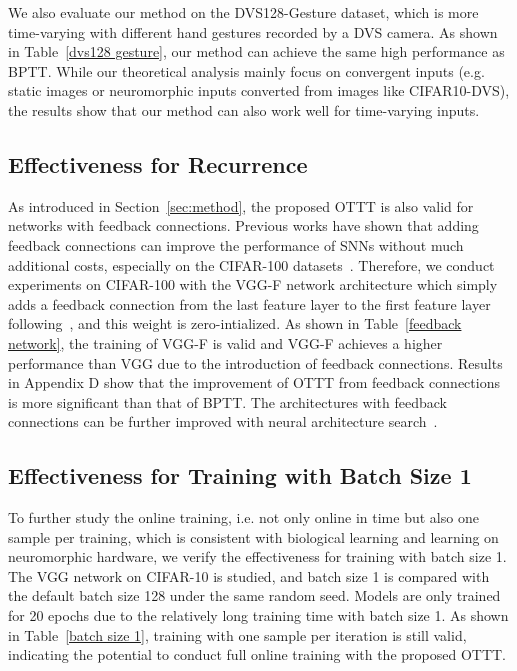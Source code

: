 \documentclass{article}
\begin{document}
We also evaluate our method on the DVS128-Gesture dataset, which is more time-varying with different hand gestures recorded by a DVS camera. As shown in Table~\ref{dvs128 gesture}, our method can achieve the same high performance as BPTT. While our theoretical analysis mainly focus on convergent inputs (e.g. static images or neuromorphic inputs converted from images like CIFAR10-DVS), the results show that our method can also work well for time-varying inputs.

\vspace{-2mm}
\subsection{Effectiveness for Recurrence}
\vspace{-2.5mm}
As introduced in Section~\ref{sec:method}, the proposed OTTT is also valid for networks with feedback connections. Previous works have shown that adding feedback connections can improve the performance of SNNs without much additional costs, especially on the CIFAR-100 datasets~\cite{xiao2021training,kim2022neural}. Therefore, we conduct experiments on CIFAR-100 with the VGG-F network architecture which simply adds a feedback connection from the last feature layer to the first feature layer following~\cite{xiao2021training}, and this weight is zero-intialized. As shown in Table~\ref{feedback network}, the training of VGG-F is valid and VGG-F achieves a higher performance than VGG due to the introduction of feedback connections. Results in Appendix D show that the improvement of OTTT from feedback connections is more significant than that of BPTT. The architectures with feedback connections can be further improved with neural architecture search~\cite{kim2022neural}.


\vspace{-2mm}
\subsection{Effectiveness for Training with Batch Size 1}
\vspace{-2.5mm}

To further study the online training, i.e. not only online in time but also one sample per training, which is consistent with biological learning and learning on neuromorphic hardware, we verify the effectiveness for training with batch size 1. The VGG network on CIFAR-10 is studied, and batch size 1 is compared with the default batch size 128 under the same random seed. Models are only trained for 20 epochs due to the relatively long training time with batch size 1. As shown in Table~\ref{batch size 1}, training with one sample per iteration is still valid, indicating the potential to conduct full online training with the proposed OTTT.
\end{document}
